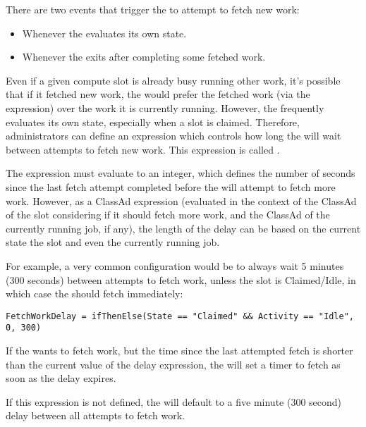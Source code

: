 There are two events that trigger the  to attempt to
fetch new work:
\begin{itemize}
\item Whenever the  evaluates its own state.
\item Whenever the  exits after completing some
  fetched work.
\end{itemize}

Even if a given compute slot is already busy running other work, it's
possible that if it fetched new work, the  would prefer
the fetched work (via the  expression) over the work it
is currently running.
However, the  frequently evaluates its own state,
especially when a slot is claimed.
Therefore, administrators can define an expression which controls how
long the  will wait between attempts to fetch new work.
This expression is called .

The  expression must evaluate to an integer,
which defines the number of seconds since the last fetch attempt
completed before the  will attempt to fetch more work.
However, as a ClassAd expression (evaluated in the context of the
ClassAd of the slot considering if it should fetch more work, and the
ClassAd of the currently running job, if any), the length of the delay
can be based on the current state the slot and even the currently
running job.

For example, a very common configuration would be to always wait 5
minutes (300 seconds) between attempts to fetch work, unless the slot
is Claimed/Idle, in which case the  should fetch
immediately:

\footnotesize
\begin{verbatim}
FetchWorkDelay = ifThenElse(State == "Claimed" && Activity == "Idle", 0, 300) 
\end{verbatim}
\normalsize

If the  wants to fetch work, but the time since the
last attempted fetch is shorter than the current value of the delay
expression, the  will set a timer to fetch as soon as
the delay expires.

If this expression is not defined, the  will default to
a five minute (300 second) delay between all attempts to fetch work.

